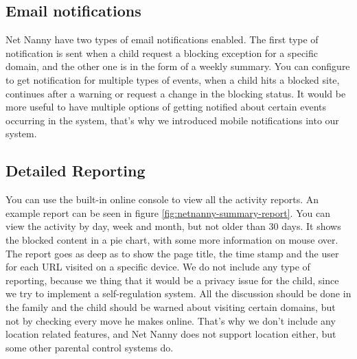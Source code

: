 \subsection{Email notifications}

Net Nanny have two types of email notifications enabled. The first type of notification is sent when a child request a blocking exception for a specific domain, and the other one is in the form of a weekly summary. You can configure to get notification for multiple types of events, when a child hits a blocked site, continues after a warning or request a change in the blocking status. It would be more useful to have multiple options of getting notified about certain events occurring in the system, that's why we introduced mobile notifications into our system.

\subsection{Detailed Reporting}

You can use the built-in online console to view all the activity reports. An example report can be seen in figure \ref{fig:netnanny-summary-report}. You can view the activity by day, week and month, but not older than 30 days. It shows the blocked content in a pie chart, with some more information on mouse over. The report goes as deep as to show the page title, the time stamp and the user for each URL visited on a specific device. We do not include any type of reporting, because we thing that it would be a privacy issue for the child, since we try to implement a self-regulation system. All the discussion should be done in the family and the child should be warned about visiting certain domains, but not by checking every move he makes online. That's why we don't include any location related features, and Net Nanny does not support location either, but some other parental control systems do.

